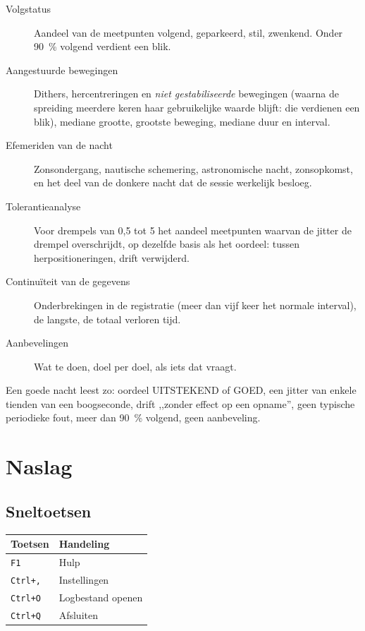 \begin{description}
  \item[Volgstatus] Aandeel van de meetpunten volgend, geparkeerd, stil,
  zwenkend. Onder 90~\% volgend verdient een blik.

  \item[Aangestuurde bewegingen] Dithers, hercentreringen en \emph{niet
  gestabiliseerde} bewegingen (waarna de spreiding meerdere keren haar
  gebruikelijke waarde blijft: die verdienen een blik), mediane grootte,
  grootste beweging, mediane duur en interval.

  \item[Efemeriden van de nacht] Zonsondergang, nautische schemering,
  astronomische nacht, zonsopkomst, en het deel van de donkere nacht dat de
  sessie werkelijk besloeg.

  \item[Tolerantieanalyse] Voor drempels van 0,5 tot 5\arcsec{} het aandeel
  meetpunten waarvan de jitter de drempel overschrijdt, op dezelfde basis als het
  oordeel: tussen herpositioneringen, drift verwijderd.

  \item[Continuïteit van de gegevens] Onderbrekingen in de registratie (meer dan
  vijf keer het normale interval), de langste, de totaal verloren tijd.

  \item[Aanbevelingen] Wat te doen, doel per doel, als iets dat vraagt.
\end{description}

\begin{tip}
Een goede nacht leest zo: oordeel UITSTEKEND of GOED, een jitter van enkele
tienden van een boogseconde, drift ,,zonder effect op een opname'', geen
typische periodieke fout, meer dan 90~\% volgend, geen aanbeveling.
\end{tip}

\chapter{Naslag}
\label{ch:ref}

\section{Sneltoetsen}

\begin{center}
\begin{tabularx}{\textwidth}{lX}
\toprule
\textbf{Toetsen} & \textbf{Handeling} \\
\midrule
\texttt{F1} & Hulp \\
\texttt{Ctrl+,} & Instellingen \\
\texttt{Ctrl+O} & Logbestand openen \\
\texttt{Ctrl+Q} & Afsluiten \\
\bottomrule
\end{tabularx}
\end{center}

